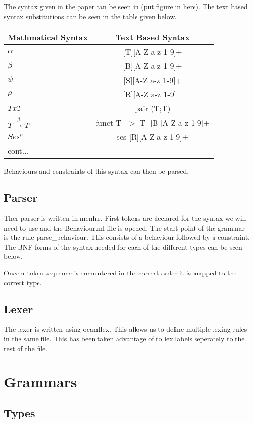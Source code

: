 \documentclass[12pt]{article}
\begin{document}
The syntax given in the paper can be seen in (put figure in here). The text based syntax substitutions can be seen in the table given below. 

\begin{tabular}{l c }
Mathmatical Syntax & Text Based Syntax \\
\hline
$\alpha$ & [T][A-Z a-z 1-9]+ \\
$\beta$ & [B][A-Z a-z 1-9]+ \\
$\psi$ & [S][A-Z a-z 1-9]+ \\
$\rho$ & [R][A-Z a-z 1-9]+ \\
$T x T$ & pair (T;T) \\
$ T\overset{\beta}{\rightarrow}T $ & funct T -$>$ T -[B][A-Z a-z 1-9]+ \\
$Ses^\rho$ & ses [R][A-Z a-z 1-9]+ \\
cont...

\end{tabular}

Behaviours and constraints of this syntax can then be parsed. 

\subsection{Parser}

Ther parser is written in menhir. First tokens are declared for the syntax we will need to use and the Behaviour.ml file is opened. The start point of the grammar is the rule parse_behaviour. This consists of a behaviour followed by a constraint. The BNF forms of the syntax needed for each of the different types can be seen below. 

Once a token sequence is encountered in the correct order it is mapped to the correct type. 

\subsection{Lexer}

The lexer is written using ocamllex. This allows us to define multiple lexing rules in the same file. This has been taken advantage of to lex labels seperately to the rest of the file. 

\section {Grammars}

\subsection{Types}
\end{document}
